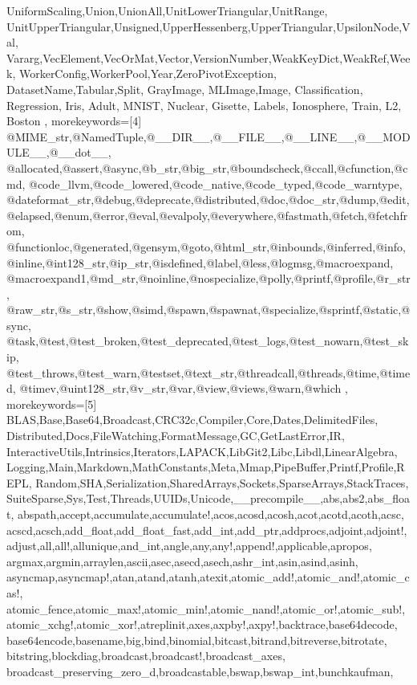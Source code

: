 {{UniformScaling,Union,UnionAll,UnitLowerTriangular,UnitRange,%
UnitUpperTriangular,Unsigned,UpperHessenberg,UpperTriangular,UpsilonNode,Val,%
Vararg,VecElement,VecOrMat,Vector,VersionNumber,WeakKeyDict,WeakRef,Week,%
WorkerConfig,WorkerPool,Year,ZeroPivotException,%
DatasetName,Tabular,Split, GrayImage, MLImage,Image, Classification, Regression,%
Iris, Adult, MNIST, Nuclear, Gisette, Labels, Ionosphere, Train, L2, Boston 
},%
%
%
morekeywords=[4]
{%
@MIME_str,@NamedTuple,@__DIR__,@__FILE__,@__LINE__,@__MODULE__,@__dot__,%
@allocated,@assert,@async,@b_str,@big_str,@boundscheck,@ccall,@cfunction,@cmd,%
@code_llvm,@code_lowered,@code_native,@code_typed,@code_warntype,%
@dateformat_str,@debug,@deprecate,@distributed,@doc,@doc_str,@dump,@edit,%
@elapsed,@enum,@error,@eval,@evalpoly,@everywhere,@fastmath,@fetch,@fetchfrom,%
@functionloc,@generated,@gensym,@goto,@html_str,@inbounds,@inferred,@info,%
@inline,@int128_str,@ip_str,@isdefined,@label,@less,@logmsg,@macroexpand,%
@macroexpand1,@md_str,@noinline,@nospecialize,@polly,@printf,@profile,@r_str,%
@raw_str,@s_str,@show,@simd,@spawn,@spawnat,@specialize,@sprintf,@static,@sync,%
@task,@test,@test_broken,@test_deprecated,@test_logs,@test_nowarn,@test_skip,%
@test_throws,@test_warn,@testset,@text_str,@threadcall,@threads,@time,@timed,%
@timev,@uint128_str,@v_str,@var,@view,@views,@warn,@which%
},%
%
%
morekeywords=[5]
{%
BLAS,Base,Base64,Broadcast,CRC32c,Compiler,Core,Dates,DelimitedFiles,%
Distributed,Docs,FileWatching,FormatMessage,GC,GetLastError,IR,%
InteractiveUtils,Intrinsics,Iterators,LAPACK,LibGit2,Libc,Libdl,LinearAlgebra,%
Logging,Main,Markdown,MathConstants,Meta,Mmap,PipeBuffer,Printf,Profile,REPL,%
Random,SHA,Serialization,SharedArrays,Sockets,SparseArrays,StackTraces,%
SuiteSparse,Sys,Test,Threads,UUIDs,Unicode,__precompile__,abs,abs2,abs_float,%
abspath,accept,accumulate,accumulate!,acos,acosd,acosh,acot,acotd,acoth,acsc,%
acscd,acsch,add_float,add_float_fast,add_int,add_ptr,addprocs,adjoint,adjoint!,%
adjust,all,all!,allunique,and_int,angle,any,any!,append!,applicable,apropos,%
argmax,argmin,arraylen,ascii,asec,asecd,asech,ashr_int,asin,asind,asinh,%
asyncmap,asyncmap!,atan,atand,atanh,atexit,atomic_add!,atomic_and!,atomic_cas!,%
atomic_fence,atomic_max!,atomic_min!,atomic_nand!,atomic_or!,atomic_sub!,%
atomic_xchg!,atomic_xor!,atreplinit,axes,axpby!,axpy!,backtrace,base64decode,%
base64encode,basename,big,bind,binomial,bitcast,bitrand,bitreverse,bitrotate,%
bitstring,blockdiag,broadcast,broadcast!,broadcast_axes,%
broadcast_preserving_zero_d,broadcastable,bswap,bswap_int,bunchkaufman,%
}}
